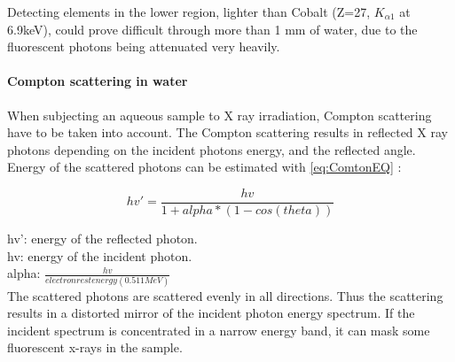 
Detecting elements in the lower region, lighter than Cobalt (Z=27, $K_{\alpha 1}$ at 6.9keV), could prove difficult through more than 1 mm of water, due to the fluorescent photons being attenuated very heavily. 


\paragraph{Compton scattering in water}
When subjecting an aqueous sample to X ray irradiation, Compton scattering have to be taken into account. The Compton scattering results in reflected X ray photons depending on the incident photons energy, and the reflected angle. Energy of the scattered photons can be estimated with \ref{eq:ComtonEQ} \citep{ComptonScatt}:

\begin{equation}
\label{eq:ComtonEQ}
hv' =  \frac{hv}{ 1+alpha*(1-cos(theta)) }
\end{equation}

\noindent hv': energy of the reflected photon.\\
hv: energy of the incident photon.\\
alpha: $\frac{hv}{electron rest energy (0.511MeV)}$ \\
 
The scattered photons are scattered evenly in all directions. Thus the scattering results in a distorted mirror of the incident photon energy spectrum. If the incident spectrum is concentrated in a narrow energy band, it can mask some fluorescent x-rays in the sample.




